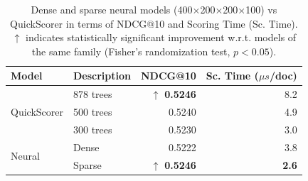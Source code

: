 \begin{table}[t]
	\centering
	\begin{tabular}{llrr}
		\toprule
		Model & Description & NDCG@10 & Sc. Time ($\mu s$/doc) \\
		\midrule
		\multirow{3}{*}{QuickScorer} & 878 trees & $\uparrow$ \textbf{0.5246} & 8.2 \\
		& 500 trees & 0.5240 & 4.9 \\
		& 300 trees & 0.5230 & 3.0 \\
		\midrule
		\multirow{2}{*}{Neural} & Dense & 0.5222 & 3.8 \\
		& Sparse & $\uparrow$ \textbf{0.5246} & \textbf{2.6} \\ 
 		\bottomrule
	\end{tabular}
	\caption{Dense and sparse neural models (400$\times$200$\times$200$\times$100)  vs QuickScorer in terms of NDCG@10 and Scoring Time (Sc. Time). $\uparrow$ indicates statistically significant improvement w.r.t. models of the same family (Fisher's randomization test,  $p < 0.05$).\label{table:sparse_400x200x200x100_partial}}
\end{table}
